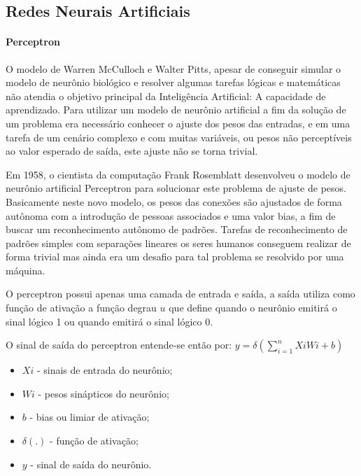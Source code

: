 \documentclass[	12pt, Times, openright, twoside, a4paper, english, brazil]{abntex2}
\begin{document}
        \subsection{Redes Neurais Artificiais}
          \paragraph*{Perceptron}
            O modelo de Warren McCulloch e Walter Pitts, apesar de conseguir simular o modelo de neurônio biológico e resolver algumas tarefas lógicas e matemáticas não atendia o objetivo principal da Inteligência Artificial: A capacidade de aprendizado.
            Para utilizar um modelo de neurônio artificial a fim da solução de um problema era necessário conhecer o ajuste dos pesos das entradas, e em uma tarefa de um cenário complexo e com muitas variáveis, ou pesos não perceptíveis ao valor esperado de saída, este ajuste não se torna trivial.
            
            Em 1958, o cientista da computação Frank Rosemblatt desenvolveu o modelo de neurônio artificial Perceptron para solucionar este problema de ajuste de pesos.
            Basicamente neste novo modelo, os pesos das conexões são ajustados de forma autônoma com a introdução de pessoas associados e uma valor bias, a fim de buscar um reconhecimento autônomo de padrões. Tarefas de reconhecimento de padrões simples com separações lineares os seres humanos conseguem realizar de forma trivial mas ainda era um desafio para tal problema se resolvido por uma máquina.

            O perceptron \cite{Flavia2014} possui apenas uma camada de entrada e saída, a saída utiliza como função de ativação a função degrau $u$ que define quando o neurônio emitirá o sinal lógico 1 ou quando emitirá o sinal lógico 0.

            O sinal de saída do perceptron entende-se então por:
            $y= \delta(\sum_{i=1}^{n}XiWi+b)$
            \begin{itemize}
            	\item $ Xi $ - sinais de entrada do neurônio;
            	\item $ Wi $ - pesos sinápticos do neurônio;
            	\item $ b $ - bias ou limiar de ativação;
            	\item $ \delta(.) $ - função de ativação;
            	\item $ y $ - sinal de saída do neurônio.
            \end{itemize}
			
\end{document}
